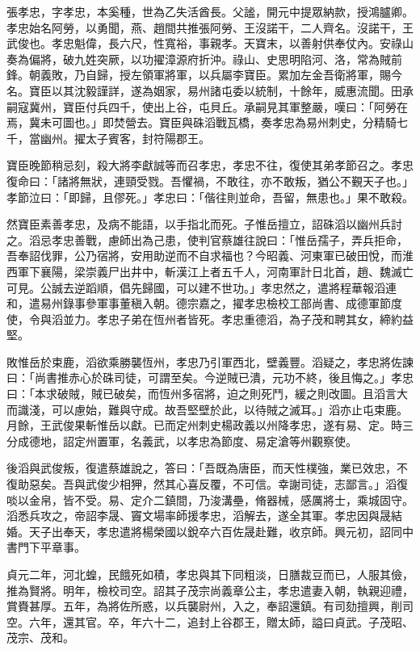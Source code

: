 \begin{pinyinscope}
 張孝忠，字孝忠，本奚種，世為乙失活酋長。父謐，開元中提眾納款，授鴻臚卿。孝忠始名阿勞，以勇聞，燕、趙間共推張阿勞、王沒諾干，二人齊名。沒諾干，王武俊也。孝忠魁偉，長六尺，性寬裕，事親孝。天寶末，以善射供奉仗內。安祿山奏為偏將，破九姓突厥，以功擢漳源府折沖。祿山、史思明陷河、洛，常為賊前鋒。朝義敗，乃自歸，授左領軍將軍，以兵屬李寶臣。累加左金吾衛將軍，賜今名。寶臣以其沈毅謹詳，遂為姻家，易州諸屯委以統制，十餘年，威惠流聞。田承嗣寇冀州，寶臣付兵四千，使出上谷，屯貝丘。承嗣見其軍整嚴，嘆曰：「阿勞在焉，冀未可圖也。」即焚營去。寶臣與硃滔戰瓦橋，奏孝忠為易州刺史，分精騎七千，當幽州。擢太子賓客，封符陽郡王。



 寶臣晚節稍忌刻，殺大將李獻誠等而召孝忠，孝忠不往，復使其弟孝節召之。孝忠復命曰：「諸將無狀，連頸受戮。吾懼禍，不敢往，亦不敢叛，猶公不覲天子也。」孝節泣曰：「即歸，且僇死。」孝忠曰：「偕往則並命，吾留，無患也。」果不敢殺。



 然寶臣素善孝忠，及病不能語，以手指北而死。子惟岳擅立，詔硃滔以幽州兵討之。滔忌孝忠善戰，慮師出為己患，使判官蔡雄往說曰：「惟岳孺子，弄兵拒命，吾奉詔伐罪，公乃宿將，安用助逆而不自求福也？今昭義、河東軍已破田悅，而淮西軍下襄陽，梁崇義尸出井中，斬漢江上者五千人，河南軍計日北首，趙、魏滅亡可見。公誠去逆蹈順，倡先歸國，可以建不世功。」孝忠然之，遣將程華報滔連和，遣易州錄事參軍事董稹入朝。德宗嘉之，擢孝忠檢校工部尚書、成德軍節度使，令與滔並力。孝忠子弟在恆州者皆死。孝忠重德滔，為子茂和聘其女，締約益堅。



 敗惟岳於束鹿，滔欲乘勝襲恆州，孝忠乃引軍西北，壁義豐。滔疑之，孝忠將佐諫曰：「尚書推赤心於硃司徒，可謂至矣。今逆賊已潰，元功不終，後且悔之。」孝忠曰：「本求破賊，賊已破矣，而恆州多宿將，迫之則死鬥，緩之則改圖。且滔言大而識淺，可以慮始，難與守成。故吾堅壁於此，以待賊之滅耳。」滔亦止屯束鹿。月餘，王武俊果斬惟岳以獻。已而定州刺史楊政義以州降孝忠，遂有易、定。時三分成德地，詔定州置軍，名義武，以孝忠為節度、易定滄等州觀察使。



 後滔與武俊叛，復遣蔡雄說之，答曰：「吾既為唐臣，而天性樸強，業已效忠，不復助惡矣。吾與武俊少相狎，然其心喜反覆，不可信。幸謝司徒，志鄙言。」滔復啖以金帛，皆不受。易、定介二鎮間，乃浚溝壘，脩器械，感厲將士，乘城固守。滔悉兵攻之，帝詔李晟、竇文場率師援孝忠，滔解去，遂全其軍。孝忠因與晟結婚。天子出奉天，孝忠遣將楊榮國以銳卒六百佐晟赴難，收京師。興元初，詔同中書門下平章事。



 貞元二年，河北蝗，民餓死如積，孝忠與其下同粗淡，日膳裁豆而已，人服其儉，推為賢將。明年，檢校司空。詔其子茂宗尚義章公主，孝忠遣妻入朝，執親迎禮，賞賚甚厚。五年，為將佐所惑，以兵襲尉州，入之，奉詔還鎮。有司劾擅興，削司空。六年，還其官。卒，年六十二，追封上谷郡王，贈太師，謚曰貞武。子茂昭、茂宗、茂和。




\end{pinyinscope}
